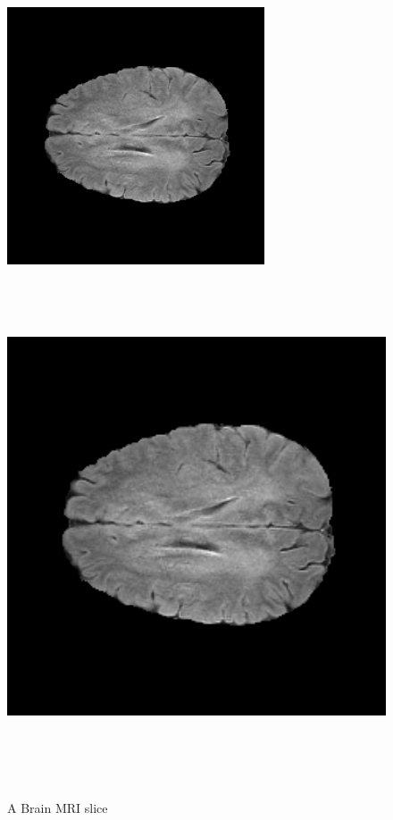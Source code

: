 \begin{figure}[!htbp]
  \begin{center}
    \leavevmode
    \ifpdf
      \includegraphics[height=3in]{Introduction/IntroductionFigs/volume_2_slice_88.png}
    \else
      \includegraphics[bb = 92 86 545 742, height=6in]{Introduction/IntroductionFigs/volume_2_slice_88.png}
    \fi
    \caption{A Brain MRI slice \cite{menze2015multimodal, bakas2017advancing, bakas2018identifying}}
    \label{RandomMRI}
  \end{center}
\end{figure}


